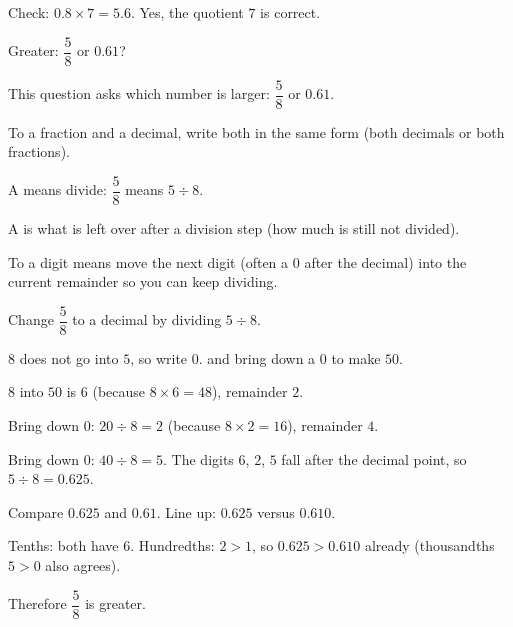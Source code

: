 
\noindent Check: $0.8 \times 7 = 5.6$. Yes, the quotient $7$ is correct.



\noindent Greater: $\dfrac{5}{8}$ or $0.61$?\ \blank[2.4cm]


\noindent This question asks which number is larger: $\dfrac{5}{8}$ or $0.61$.

\begin{words}
  \item To a fraction and a decimal, write both in the same form
        (both decimals or both fractions).
  \item A means divide: $\dfrac{5}{8}$ means $5 \div 8$.
  \item A is what is left over after a division step (how much is
        still not divided).
  \item To a digit means move the next digit (often a $0$ after the
        decimal) into the current remainder so you can keep dividing.
\end{words}

\begin{steps}
  \item Change $\dfrac{5}{8}$ to a decimal by dividing $5 \div 8$.
  \item $8$ does not go into $5$, so write $0.$ and bring down a $0$ to make $50$.
  \item $8$ into $50$ is $6$ (because $8 \times 6 = 48$), remainder $2$.
  \item Bring down $0$: $20 \div 8 = 2$ (because $8 \times 2 = 16$), remainder $4$.
  \item Bring down $0$: $40 \div 8 = 5$. The digits $6$, $2$, $5$ fall after the
        decimal point, so $5 \div 8 = 0.625$.
  \item Compare $0.625$ and $0.61$. Line up: $0.625$ versus $0.610$.
  \item Tenths: both have $6$. Hundredths: $2 > 1$, so $0.625 > 0.610$ already
        (thousandths $5 > 0$ also agrees).
  \item Therefore $\dfrac{5}{8}$ is greater.
\end{steps}

